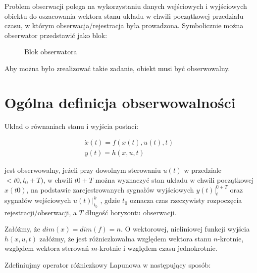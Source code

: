 \documentclass{article}
\begin{document}
		Problem obserwacji polega na wykorzystaniu danych wejściowych i wyjściowych
		obiektu do oszacowania wektora stanu układu w chwili początkowej
		przedziału czasu, w którym obserwacja/rejestracja była prowadzona.
		Symbolicznie można obserwator przedstawić jako blok:
					\begin{figure}[H]
			\centering
			\caption{Blok obserwatora}
		\end{figure}

		Aby można było zrealizować takie zadanie, obiekt musi być obserwowalny.
	\section{Ogólna definicja obserwowalności}
		Układ o równaniach stanu i wyjścia postaci:
		\begin{figure}[H]
			\begin{align*}
				\dot{x}(t) = f(x(t), u(t),t) \\ 
				y(t) = h(x, u, t)
			\end{align*}
			\label{uklad}
		\end{figure}	
		jest obserwowalny, jeżeli przy dowolnym sterowaniu $u(t)$ w przedziale $<t0, t_0+ T)$, w
		chwili $t0+ T$ można wyznaczyć stan układu w chwili początkowej $x(t0)$, na podstawie
		zarejestrowanych sygnałów wyjściowych $y(t)|^{0+T}_t$
		oraz sygnałów wejściowych $u(t)|^k_{t_0}$ , gdzie $t_0$ oznacza czas 
		rzeczywisty rozpoczęcia rejestracji/obserwacji, a $T$ długość horyzontu obserwacji.

		Załóżmy, że $dim(x) = dim(f) = n$. O wektorowej, nieliniowej funkcji wyjścia $h(x , u, t)$
		załóżmy, że jest różniczkowalna względem wektora stanu $n$-krotnie, względem wektora
		sterowań $m$-krotnie i względem czasu jednokrotnie.

		Zdefiniujmy operator różniczkowy Lapunowa w następujący sposób:
		
\end{document}
